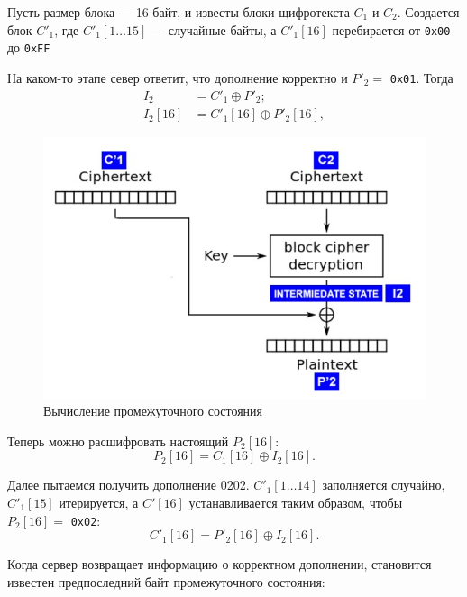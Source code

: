 \documentclass[a4paper, 14pt]{extarticle}
\begin{document}
Пусть размер блока --- 16 байт, и известы блоки щифротекста $C_1$ и $C_2$. Создается блок $C'_1$, где $C'_1 [1 \ldots 15]$ --- случайные байты, а $C'_1[16]$ перебирается от \texttt{0x00} до \texttt{0xFF} %

На каком-то этапе север ответит, что дополнение корректно и $P'_2 = $ \texttt{0x01}. Тогда %
\begin{equation*}
    \begin{split}
        I_2 &= C'_1 \oplus P'_2; \\
        I_2 [16] &= C'_1[16] \oplus P'_2[16],
    \end{split}
\end{equation*}
\begin{figure}[h]
    \centering
    \includegraphics[width=\textwidth]{img/S018.jpg}
    \caption{Вычисление промежуточного состояния}%
\end{figure}

Теперь можно расшифровать настоящий $P_2[16]$:
\begin{equation*}
    P_2[16] = C_1[16] \oplus I_2[16].
\end{equation*}

Далее пытаемся получить дополнение 0202. $C'_1[1 \ldots 14]$ заполняется случайно, $C'_1[15]$ итерируется, а $C'[16]$ устанавливается таким образом, чтобы $P_2[16] = $ \texttt{0x02}: %
\begin{equation*}
    C'_1[16] = P'_2[16] \oplus I_2[16].
\end{equation*}

Когда сервер возвращает информацию о корректном дополнении, становится известен предпоследний байт промежуточного состояния:
\end{document}
